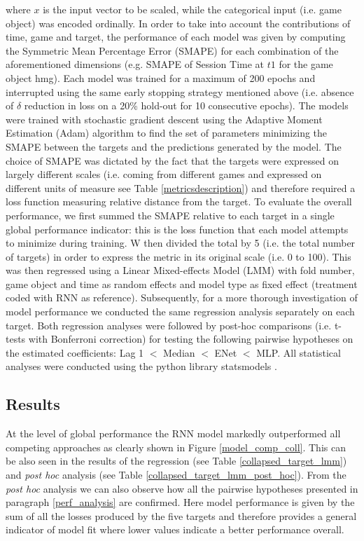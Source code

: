 where $x$ is the input vector to be scaled, while the categorical input (i.e. game object) was encoded ordinally. In order to take into account the contributions of time, game and target, the performance of each model was given by computing the Symmetric Mean Percentage Error (SMAPE) \cite{zhu2017deep} for each combination of the aforementioned dimensions (e.g. SMAPE of Session Time at $t1$ for the game object hmg). Each model was trained for a maximum of 200 epochs and interrupted using the same early stopping strategy mentioned above (i.e. absence of $\delta$ reduction in loss on a 20\% hold-out for 10 consecutive epochs). The models were trained with stochastic gradient descent using the Adaptive Moment Estimation (Adam) \cite{kingma2014adam} algorithm to find the set of parameters minimizing the SMAPE between the targets and the predictions generated by the model. The choice of SMAPE was dictated by the fact that the targets were expressed on largely different scales (i.e. coming from different games and expressed on different units of measure see Table \ref{metricsdescription}) and therefore required a loss function measuring relative distance from the target. To evaluate the overall performance, we first summed the SMAPE relative to each target in a single global performance indicator: this is the loss function that each model attempts to minimize during training. W then divided the total by 5 (i.e. the total number of targets) in order to express the metric in its original scale (i.e. 0 to 100). This was then regressed using a Linear Mixed-effects Model (LMM) with fold number, game object and time as random effects and model type as fixed effect (treatment coded with RNN as reference). Subsequently, for a more thorough investigation of model performance we conducted the same regression analysis separately on each target. Both regression analyses were followed by post-hoc comparisons (i.e. t-tests with Bonferroni correction) for testing the following pairwise hypotheses on the estimated coefficients: Lag 1 $<$ Median $<$ ENet $<$ MLP. All statistical analyses were conducted using the python library statsmodels \cite{seabold2010statsmodels}. 



\subsection{Results}
At the level of global performance the RNN model markedly outperformed all competing approaches as clearly shown in Figure \ref{model_comp_coll}. This can be also seen in the results of the regression (see Table \ref{collapsed_target_lmm}) and  \textit{post hoc} analysis (see Table \ref{collapsed_target_lmm_post_hoc}). From the \textit{post hoc} analysis we can also observe how all the pairwise hypotheses presented in paragraph \ref{perf_analysis} are confirmed. Here model performance is given by the sum of all the losses produced by the five targets and therefore provides a general indicator of model fit where lower values indicate a better performance overall.

